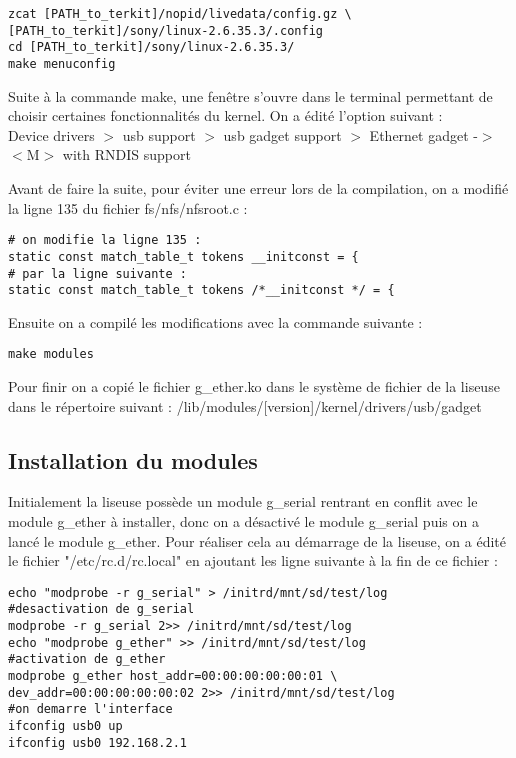 \begin{lstlisting}
zcat [PATH_to_terkit]/nopid/livedata/config.gz \
[PATH_to_terkit]/sony/linux-2.6.35.3/.config
cd [PATH_to_terkit]/sony/linux-2.6.35.3/
make menuconfig
\end{lstlisting}

Suite à la commande make, une fenêtre s'ouvre dans le terminal permettant de choisir certaines fonctionnalités du kernel. On a édité l'option suivant : \\
Device drivers $>$ usb support $>$ usb gadget support $>$ Ethernet gadget -$>$ $<$M$>$ with RNDIS support

Avant de faire la suite, pour éviter une erreur lors de la compilation, on a modifié la ligne 135 du fichier fs/nfs/nfsroot.c :

\begin{lstlisting}
# on modifie la ligne 135 :
static const match_table_t tokens __initconst = {
# par la ligne suivante :
static const match_table_t tokens /*__initconst */ = { 
\end{lstlisting} 

Ensuite on a compilé les modifications avec la commande suivante :

\begin{lstlisting}
make modules
\end{lstlisting}

Pour finir on a copié le fichier g_ether.ko dans le système de fichier de la liseuse dans le répertoire suivant : /lib/modules/[version]/kernel/drivers/usb/gadget
 
\subsection{Installation du modules}

Initialement la liseuse possède un module g_serial rentrant en conflit avec le module g_ether à installer, donc on a désactivé le module g_serial puis on  a lancé le module g_ether. Pour réaliser cela au démarrage de la liseuse, on a édité le fichier "/etc/rc.d/rc.local" en ajoutant les ligne suivante à la fin de ce fichier : 

\begin{lstlisting}
echo "modprobe -r g_serial" > /initrd/mnt/sd/test/log
#desactivation de g_serial
modprobe -r g_serial 2>> /initrd/mnt/sd/test/log
echo "modprobe g_ether" >> /initrd/mnt/sd/test/log
#activation de g_ether
modprobe g_ether host_addr=00:00:00:00:00:01 \
dev_addr=00:00:00:00:00:02 2>> /initrd/mnt/sd/test/log
#on demarre l'interface
ifconfig usb0 up
ifconfig usb0 192.168.2.1
\end{lstlisting}		

